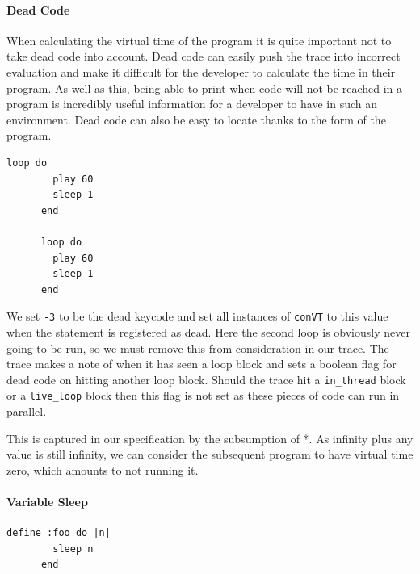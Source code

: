 \documentclass[11pt, abstracton, twoside, titlepage=true]{scrartcl}
\begin{document}
\paragraph{Dead Code}

When calculating the virtual time of the program it is quite important not to 
take dead code into account. Dead code can easily push the trace into incorrect 
evaluation and make it difficult for the developer to calculate the time in their 
program. As well as this, being able to print when code will not be reached in a 
program is incredibly useful information for a developer to have in such an 
environment. Dead code can also be easy to locate thanks to the form of the program.

\begin{minipage}{\textwidth}
	\begin{lstlisting}[style = sonicpi]
      loop do
        play 60
        sleep 1
      end

      loop do
        play 60
        sleep 1
      end
	\end{lstlisting}
	 \label{dead}
\end{minipage}

We set \texttt{-3} to be the dead keycode and set all instances of \texttt{conVT} 
to this value when the statement is registered as dead. Here the second loop is 
obviously never going to be run, so we must remove this from consideration in our
trace. The trace makes a note of when it has seen a loop block and sets a boolean 
flag for dead code on hitting another loop block. Should the trace hit a 
\texttt{in\_thread} block or a \texttt{live\_loop} block then this flag is not set 
as these pieces of code can run in parallel.

This is captured in our specification by the subsumption of *. As infinity plus 
any value is still infinity, we can consider the subsequent program to have 
virtual time zero, which amounts to not running it.

\paragraph{Variable Sleep}

\begin{minipage}{\textwidth}
	\begin{lstlisting}[style = sonicpi]
      define :foo do |n|
        sleep n
      end
	\end{lstlisting}
	 \label{variableSleep}
\end{minipage}
\end{document}
